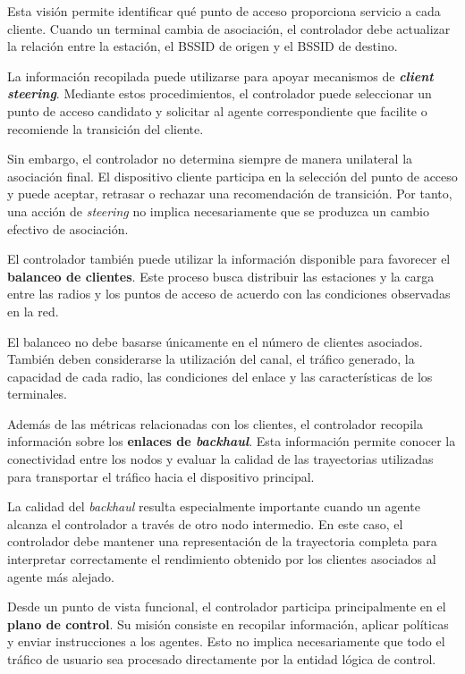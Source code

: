 Esta visión permite identificar qué punto de acceso proporciona servicio
a cada cliente. Cuando un terminal cambia de asociación, el controlador
debe actualizar la relación entre la estación, el BSSID de origen y el
BSSID de destino.

La información recopilada puede utilizarse para apoyar mecanismos de
\textbf{\textit{client steering}}. Mediante estos procedimientos, el
controlador puede seleccionar un punto de acceso candidato y solicitar al
agente correspondiente que facilite o recomiende la transición del
cliente.

Sin embargo, el controlador no determina siempre de manera unilateral la
asociación final. El dispositivo cliente participa en la selección del
punto de acceso y puede aceptar, retrasar o rechazar una recomendación de
transición. Por tanto, una acción de \textit{steering} no implica
necesariamente que se produzca un cambio efectivo de asociación.

El controlador también puede utilizar la información disponible para
favorecer el \textbf{balanceo de clientes}. Este proceso busca distribuir
las estaciones y la carga entre las radios y los puntos de acceso de
acuerdo con las condiciones observadas en la red.

El balanceo no debe basarse únicamente en el número de clientes
asociados. También deben considerarse la utilización del canal, el
tráfico generado, la capacidad de cada radio, las condiciones del enlace
y las características de los terminales.

Además de las métricas relacionadas con los clientes, el controlador
recopila información sobre los
\textbf{enlaces de \textit{backhaul}}. Esta información permite conocer
la conectividad entre los nodos y evaluar la calidad de las trayectorias
utilizadas para transportar el tráfico hacia el dispositivo principal.

La calidad del \textit{backhaul} resulta especialmente importante cuando
un agente alcanza el controlador a través de otro nodo intermedio. En
este caso, el controlador debe mantener una representación de la
trayectoria completa para interpretar correctamente el rendimiento
obtenido por los clientes asociados al agente más alejado.

Desde un punto de vista funcional, el controlador participa
principalmente en el \textbf{plano de control}. Su misión consiste en
recopilar información, aplicar políticas y enviar instrucciones a los
agentes. Esto no implica necesariamente que todo el tráfico de usuario
sea procesado directamente por la entidad lógica de control.

